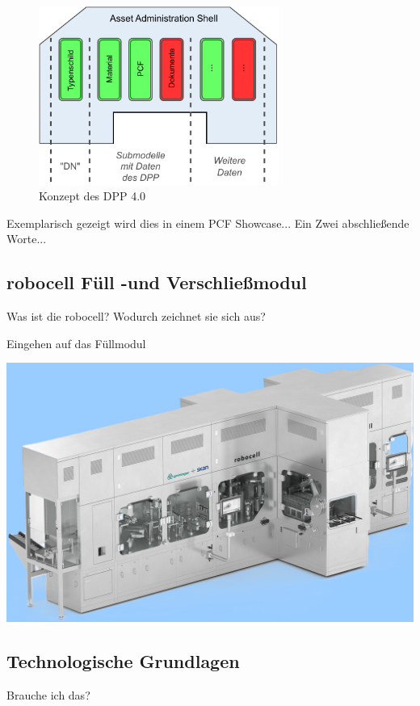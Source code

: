 \begin{figure}[htbp]
    \centering
    \includegraphics[width=0.7\textwidth]{Bilder/dpp_konzept.pdf}
    \caption{Konzept des DPP 4.0}
    \label{fig:klassifizierungDT}
\end{figure}


Exemplarisch gezeigt wird dies in einem PCF Showcase...
Ein Zwei abschließende Worte...


%

\subsection{robocell Füll -und Verschließmodul}

Was ist die robocell? Wodurch zeichnet sie sich aus?

Eingehen auf das Füllmodul


\includegraphics{Bilder/robocell_FS2_rgb_Logo.png}
\subsection{Technologische Grundlagen}
Brauche ich das?
